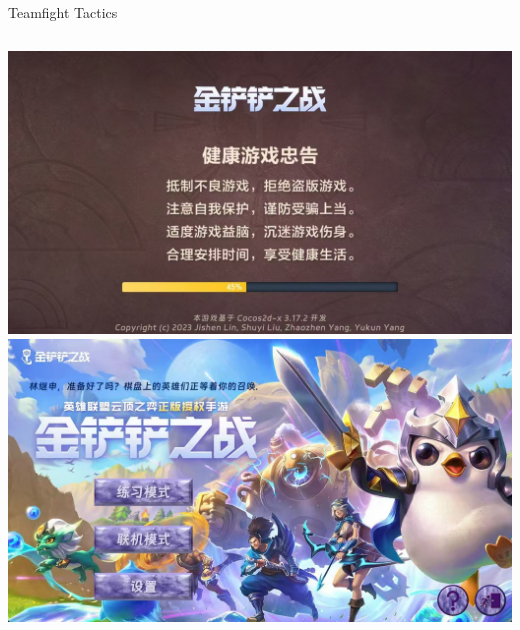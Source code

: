 \documentclass{beamer}
\begin{document}
\begin{frame}[fragile]{Teamfight Tactics}
\begin{columns}
\begin{column}{0.4\textwidth}
\includegraphics[width=\textwidth]
{figures/teamfight_tactics_1}
\includegraphics[width=\textwidth]
{figures/teamfight_tactics_2}
\end{column}
\end{columns}
\end{frame}
\end{document}
